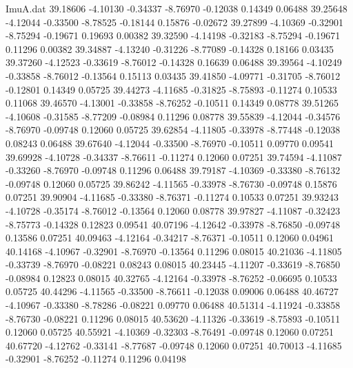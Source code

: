 \begin{filecontents}{ImuA.dat}
  39.18606   -4.10130   -0.34337   -8.76970   -0.12038    0.14349    0.06488
  39.25648   -4.12044   -0.33500   -8.78525   -0.18144    0.15876   -0.02672
  39.27899   -4.10369   -0.32901   -8.75294   -0.19671    0.19693    0.00382
  39.32590   -4.14198   -0.32183   -8.75294   -0.19671    0.11296    0.00382
  39.34887   -4.13240   -0.31226   -8.77089   -0.14328    0.18166    0.03435
  39.37260   -4.12523   -0.33619   -8.76012   -0.14328    0.16639    0.06488
  39.39564   -4.10249   -0.33858   -8.76012   -0.13564    0.15113    0.03435
  39.41850   -4.09771   -0.31705   -8.76012   -0.12801    0.14349    0.05725
  39.44273   -4.11685   -0.31825   -8.75893   -0.11274    0.10533    0.11068
  39.46570   -4.13001   -0.33858   -8.76252   -0.10511    0.14349    0.08778
  39.51265   -4.10608   -0.31585   -8.77209   -0.08984    0.11296    0.08778
  39.55839   -4.12044   -0.34576   -8.76970   -0.09748    0.12060    0.05725
  39.62854   -4.11805   -0.33978   -8.77448   -0.12038    0.08243    0.06488
  39.67640   -4.12044   -0.33500   -8.76970   -0.10511    0.09770    0.09541
  39.69928   -4.10728   -0.34337   -8.76611   -0.11274    0.12060    0.07251
  39.74594   -4.11087   -0.33260   -8.76970   -0.09748    0.11296    0.06488
  39.79187   -4.10369   -0.33380   -8.76132   -0.09748    0.12060    0.05725
  39.86242   -4.11565   -0.33978   -8.76730   -0.09748    0.15876    0.07251
  39.90904   -4.11685   -0.33380   -8.76371   -0.11274    0.10533    0.07251
  39.93243   -4.10728   -0.35174   -8.76012   -0.13564    0.12060    0.08778
  39.97827   -4.11087   -0.32423   -8.75773   -0.14328    0.12823    0.09541
  40.07196   -4.12642   -0.33978   -8.76850   -0.09748    0.13586    0.07251
  40.09463   -4.12164   -0.34217   -8.76371   -0.10511    0.12060    0.04961
  40.14168   -4.10967   -0.32901   -8.76970   -0.13564    0.11296    0.08015
  40.21036   -4.11805   -0.33739   -8.76970   -0.08221    0.08243    0.08015
  40.23445   -4.11207   -0.33619   -8.76850   -0.08984    0.12823    0.08015
  40.32765   -4.12164   -0.33978   -8.76252   -0.06695    0.10533    0.05725
  40.44296   -4.11565   -0.33500   -8.76611   -0.12038    0.09006    0.06488
  40.46727   -4.10967   -0.33380   -8.78286   -0.08221    0.09770    0.06488
  40.51314   -4.11924   -0.33858   -8.76730   -0.08221    0.11296    0.08015
  40.53620   -4.11326   -0.33619   -8.75893   -0.10511    0.12060    0.05725
  40.55921   -4.10369   -0.32303   -8.76491   -0.09748    0.12060    0.07251
  40.67720   -4.12762   -0.33141   -8.77687   -0.09748    0.12060    0.07251
  40.70013   -4.11685   -0.32901   -8.76252   -0.11274    0.11296    0.04198

\end{filecontents}
